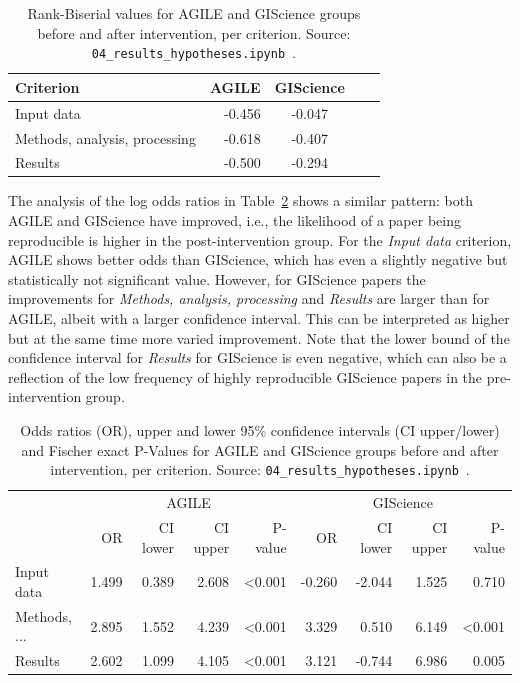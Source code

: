 \documentclass{josis}
\begin{document}
\begin{table}
\centering
\begin{tabular}{lrcrr}
\hline
Criterion & AGILE & GIScience \\
\hline
Input data & -0.456 & -0.047 \\
Methods, analysis, processing & -0.618 & -0.407 \\ 
Results & -0.500 & -0.294\\ 
\hline
\end{tabular}
\caption{Rank-Biserial values for AGILE and GIScience groups before and after intervention, per criterion. Source: \texttt{04\_results\_hypotheses.ipynb}~\cite{data}.}
\label{tab:rankbiserial}
\end{table}


The analysis of the log odds ratios in Table~\ref{tab:oddsratios} shows a similar pattern: both AGILE and GIScience have improved, i.e., the likelihood of a paper being reproducible is higher in the post-intervention group. 
For the \textit{Input data} criterion, AGILE shows better odds than GIScience, which has even a slightly negative but statistically not significant value. 
However, for GIScience papers the improvements for \textit{Methods, analysis, processing} and \textit{Results} are larger than for AGILE, albeit with a larger confidence interval. 
This can be interpreted as higher but at the same time more varied improvement.
Note that the lower bound of the confidence interval for \textit{Results} for GIScience is even negative, which can also be a reflection of the low frequency of highly reproducible GIScience papers in the pre-intervention group.

\begin{table}
\begin{tabular}{lrrrrrrrr}
\toprule
 & \multicolumn{4}{c}{AGILE} & \multicolumn{4}{c}{GIScience} \\
 & OR & CI lower & CI upper & P-value & OR & CI lower & CI upper & P-value \\
\midrule
Input data & 1.499 & 0.389 & 2.608 & <0.001 & -0.260 & -2.044 & 1.525 & 0.710 \\
Methods, ... & 2.895 & 1.552 & 4.239 & <0.001 & 3.329 & 0.510 & 6.149 & <0.001 \\
Results & 2.602 & 1.099 & 4.105 & <0.001 & 3.121 & -0.744 & 6.986 & 0.005 \\
\bottomrule
\end{tabular}
\caption{Odds ratios (OR), upper and lower 95\% confidence intervals (CI upper/lower) and Fischer exact P-Values for AGILE and GIScience groups before and after intervention, per criterion. Source: \texttt{04\_results\_hypotheses.ipynb}~\cite{data}.}
\label{tab:oddsratios}
\end{table}
\end{document}
